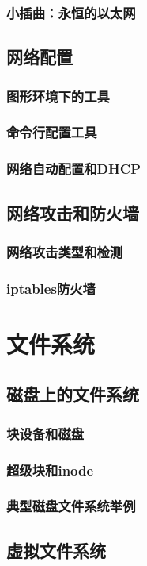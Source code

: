 \documentclass[amstex,twoside]{ctexbook}
\begin{document}
\subsection*{小插曲：永恒的以太网}

\section{网络配置\label{sec:ifconfig}}
\subsection{图形环境下的工具	}
\subsection{命令行配置工具}
\subsection{网络自动配置和DHCP}
\section{网络攻击和防火墙	}
\subsection{网络攻击类型和检测}
\subsection{iptables防火墙}

\chapter{文件系统}
\section{磁盘上的文件系统	}
\subsection{块设备和磁盘}
\subsection{超级块和inode}
\subsection{典型磁盘文件系统举例}
\section{虚拟文件系统}
\end{document}
